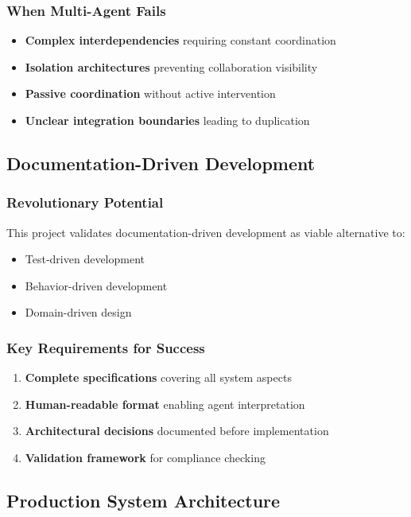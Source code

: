 \documentclass[11pt]{article}
\begin{document}
\subsubsection{When Multi-Agent Fails}
\label{sec:orge8d8d40}
\begin{itemize}
\item \textbf{\textbf{Complex interdependencies}} requiring constant coordination
\item \textbf{\textbf{Isolation architectures}} preventing collaboration visibility
\item \textbf{\textbf{Passive coordination}} without active intervention
\item \textbf{\textbf{Unclear integration boundaries}} leading to duplication
\end{itemize}
\subsection{Documentation-Driven Development}
\label{sec:org0af9aff}
\subsubsection{Revolutionary Potential}
\label{sec:orga97b0ea}
This project validates documentation-driven development as viable alternative to:
\begin{itemize}
\item Test-driven development
\item Behavior-driven development
\item Domain-driven design
\end{itemize}
\subsubsection{Key Requirements for Success}
\label{sec:orgca09bb8}
\begin{enumerate}
\item \textbf{\textbf{Complete specifications}} covering all system aspects
\item \textbf{\textbf{Human-readable format}} enabling agent interpretation
\item \textbf{\textbf{Architectural decisions}} documented before implementation
\item \textbf{\textbf{Validation framework}} for compliance checking
\end{enumerate}
\subsection{Production System Architecture}
\label{sec:org14bd471}
\end{document}
